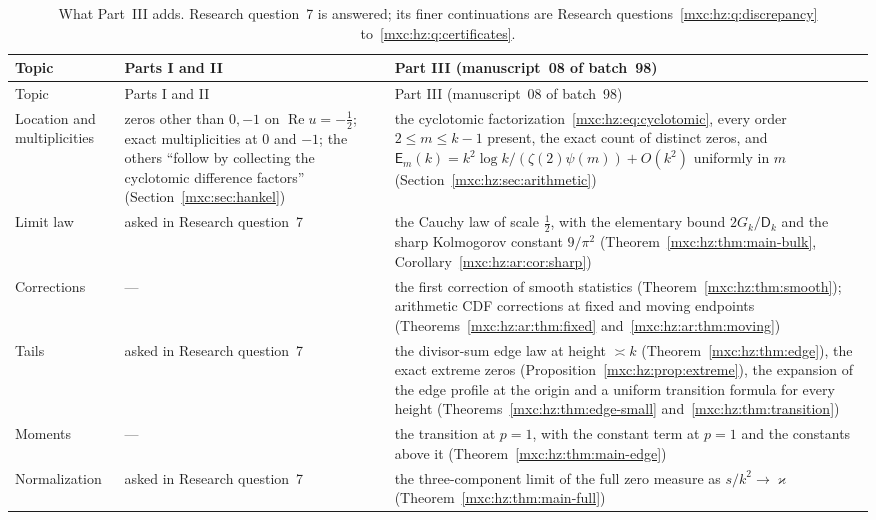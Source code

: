 \documentclass[11pt]{article}
\numberwithin{equation}{section}
\theoremstyle{definition}
\theoremstyle{remark}
\begin{document}
{\small
\renewcommand{\arraystretch}{1.12}
\setlength{\LTcapwidth}{\textwidth}
\begin{longtable}{@{}>{\raggedright\arraybackslash}p{}>{\raggedright\arraybackslash}p{}>{\raggedright\arraybackslash}p{}@{}}
\caption{What Part~III adds. Research question~7 is answered; its finer
continuations are Research questions~\ref{mxc:hz:q:discrepancy}
to~\ref{mxc:hz:q:certificates}.}\label{mxc:hz:tab:claims}\\
\toprule
Topic & Parts I and II & Part III (manuscript~08 of batch~98)\\
\midrule
\endfirsthead
\toprule
Topic & Parts I and II & Part III (manuscript~08 of batch~98)\\
\midrule
\endhead
\bottomrule
\endfoot
Location and multiplicities &
zeros other than $0,-1$ on $\operatorname{Re}u=-\frac12$; exact
multiplicities at $0$ and $-1$; the others ``follow by collecting the
cyclotomic difference factors'' (Section~\ref{mxc:sec:hankel}) &
the cyclotomic factorization~\eqref{mxc:hz:eq:cyclotomic}, every order
$2\le m\le k-1$ present, the exact count of distinct zeros, and
$\mathsf E_m(k)=k^2\log k/(\zeta(2)\psi(m))+O(k^2)$ uniformly in $m$
(Section~\ref{mxc:hz:sec:arithmetic})\\
Limit law &
asked in Research question~7 &
the Cauchy law of scale $\frac12$, with the elementary bound
$2G_k/\mathsf D_k$ and the sharp Kolmogorov constant $9/\pi^2$
(Theorem~\ref{mxc:hz:thm:main-bulk},
Corollary~\ref{mxc:hz:ar:cor:sharp})\\
Corrections & --- &
the first correction of smooth statistics
(Theorem~\ref{mxc:hz:thm:smooth}); arithmetic CDF corrections at fixed and
moving endpoints (Theorems~\ref{mxc:hz:ar:thm:fixed}
and~\ref{mxc:hz:ar:thm:moving})\\
Tails &
asked in Research question~7 &
the divisor-sum edge law at height $\asymp k$
(Theorem~\ref{mxc:hz:thm:edge}), the exact extreme zeros
(Proposition~\ref{mxc:hz:prop:extreme}), the expansion of the edge profile
at the origin and a uniform transition formula for every height
(Theorems~\ref{mxc:hz:thm:edge-small} and~\ref{mxc:hz:thm:transition})\\
Moments & --- &
the transition at $p=1$, with the constant term at $p=1$ and the constants
above it (Theorem~\ref{mxc:hz:thm:main-edge})\\
Normalization &
asked in Research question~7 &
the three-component limit of the full zero measure as $s/k^2\to\varkappa$
(Theorem~\ref{mxc:hz:thm:main-full})\\
\end{longtable}
}
\end{document}
